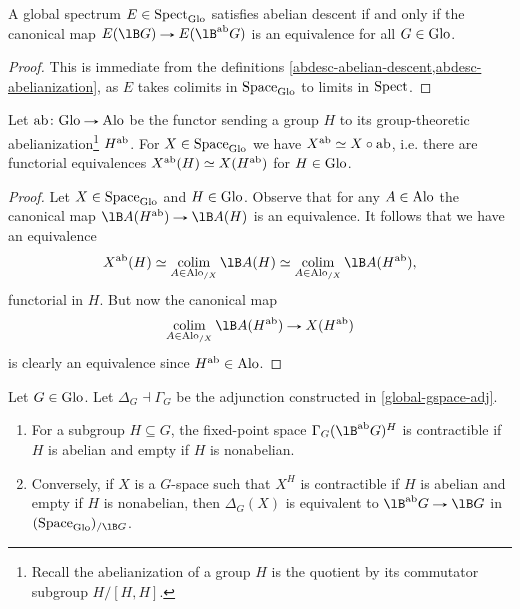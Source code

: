 \begin{lemma}
  \label{abdesc-abelian-descent-abelianization}
  A global spectrum $E \in \mathrm{Spect}_{\mathrm{Glo}}$ satisfies abelian descent if
  and only if the canonical map $E(\lB G) \to E(\lB^\ab G)$ is an
  equivalence for all $G \in \mathrm{Glo}$.
\end{lemma}

\begin{proof}
  This is immediate from the definitions
  \cref{abdesc-abelian-descent,abdesc-abelianization}, as $E$ takes
  colimits in $\mathrm{Space}_{\mathrm{Glo}}$ to limits in $\mathrm{Spect}$.
\end{proof}

\begin{lemma}
  \label{abdesc-abelianization-alternate}
  Let $\ab \c \Glo \to \Alo$ be the functor sending a group $H$ to
  its group-theoretic abelianization\footnote{Recall the
    abelianization of a group $H$ is the quotient by its commutator
    subgroup $H/[H,H]$.}  $H^{\mathrm{ab}}$. For $X \in \mathrm{Space}_{\mathrm{Glo}}$ we have
  $X^{\mathrm{ab}} \simeq X \circ \mathrm{ab}$, i.e. there are functorial equivalences
  $X^{\mathrm{ab}}(H) \simeq X(H^{\mathrm{ab}})$ for $H \in \mathrm{Glo}$.
\end{lemma}

\begin{proof}
  Let $X \in \mathrm{Space}_{\mathrm{Glo}}$ and $H \in \mathrm{Glo}$. Observe that for any
  $A \in \mathrm{Alo}$ the canonical map $\lB A(H^\ab) \to \lB A(H)$ is an
  equivalence. It follows that we have an equivalence
  \[
  X^\ab(H) \iso
  \colim_{A \in \Alo_{/X}} \lB A(H) \iso
  \colim_{A \in \Alo_{/X}} \lB A(H^\ab),
  \]
  functorial in $H$. But now the canonical map
  \[
  \colim_{A \in \Alo_{/X}} \lB A(H^\ab) \to X(H^\ab)
  \]
  is clearly an equivalence since $H^{\mathrm{ab}} \in \mathrm{Alo}$.
\end{proof}

\begin{lemma}
  \label{abdesc-abelianization-as-Gspace}
  Let $G \in \mathrm{Glo}$. Let $\Delta_G \dashv \Gamma_G$ be the adjunction
  constructed in \cref{global-gspace-adj}.
  \begin{enumerate}
  \item \label{abdesc-abelianization-gamma} For a subgroup
    $H \subseteq G$, the fixed-point space $\Gamma_G(\lB^\ab G)^H$ is
    contractible if $H$ is abelian and empty if $H$ is nonabelian.
  \item \label{abdesc-abelianization-delta} Conversely, if $X$ is a
    $G$-space such that $X^H$ is contractible if $H$ is abelian and
    empty if $H$ is nonabelian, then $\Delta_G(X)$ is equivalent to
    $\lB^\ab G \to \lB G$ in $(\Space_\Glo)_{/\lB G}$.
  \end{enumerate}
\end{lemma}

